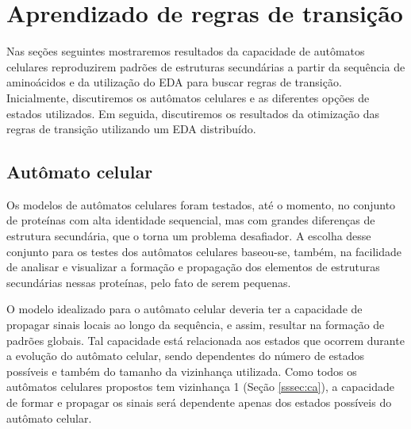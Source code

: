 \chapter{Aprendizado de regras de transição}

Nas seções seguintes mostraremos resultados da capacidade de autômatos celulares reproduzirem padrões de estruturas secundárias a partir da sequência de aminoácidos e da utilização do EDA para buscar regras de transição. Inicialmente, discutiremos os autômatos celulares e as diferentes opções de estados utilizados. Em seguida, discutiremos os resultados da otimização das regras de transição utilizando um EDA distribuído.  


\section{Autômato celular}

Os modelos de autômatos celulares foram testados, até o momento,  no conjunto de proteínas com alta identidade sequencial, mas com grandes diferenças de estrutura secundária, que o torna um problema desafiador. A escolha desse conjunto para os testes dos autômatos celulares baseou-se, também, na facilidade de analisar e visualizar a formação e propagação dos elementos de estruturas secundárias nessas proteínas, pelo fato de serem pequenas.


O modelo idealizado para o autômato celular deveria ter a capacidade de propagar sinais locais ao longo da sequência, e assim, resultar na formação de padrões globais. Tal capacidade está relacionada aos estados que ocorrem durante a evolução do autômato celular, sendo dependentes do número de estados possíveis e também do tamanho da vizinhança utilizada. Como todos os autômatos celulares propostos tem vizinhança 1 (Seção \ref{sssec:ca}), a capacidade de formar e propagar os sinais será dependente apenas dos estados possíveis do autômato celular.

